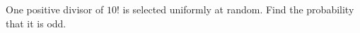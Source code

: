 One positive divisor of $10!$ is selected uniformly at random. Find the probability that it is odd.
